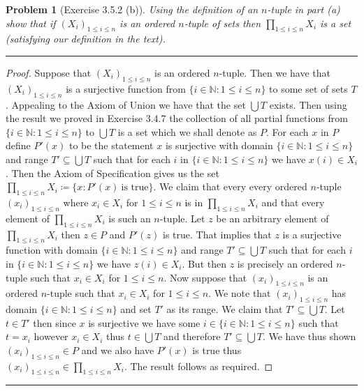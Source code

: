 \documentclass{article}
\newcommand{\lined}{\noindent\rule{\textwidth}{1pt}}
\newtheorem*{problem}{Problem}
\begin{document}
	\newpage
	
	\begin{problem}[Exercise 3.5.2 (b)]
		Using the definition of an $n$-tuple in part (a) show that if $(X_i)_{1 \leq i \leq n}$ is an ordered $n$-tuple of sets then 
		$\prod_{1 \leq i \leq n} X_i$ is a set (satisfying our definition in the text).
	\end{problem}
	
	\lined
	\begin{proof}
		Suppose that $(X_i)_{1 \leq i \leq n}$ is an ordered $n$-tuple. Then we have that $(X_i)_{1 \leq i \leq n}$ is a surjective function
		from $\{i \in \mathbb{N}:1\leq i \leq n\}$ to some set of sets $T$. Appealing to the Axiom of Union we have that the set 
		$\bigcup T$ exists. Then using the result we proved in Exercise 3.4.7 the collection of all partial functions from $\{i \in \mathbb{N}:1\leq i \leq n\}$ to $\bigcup T$ is a set which we shall denote as $P$. For each $x$ in $P$ define $P'(x)$ to be the statement $x$ is surjective with domain $\{i \in \mathbb{N}:1\leq i \leq n\}$ and range $T' \subseteq \bigcup T$ such that for each $i$ in $\{i \in \mathbb{N}:1\leq i \leq n\}$ we have $x(i) \in X_i$. Then the Axiom of Specification gives us the set 
		$\prod_{1 \leq i \leq n} X_i \coloneqq \{x:P'(x)\ \text{is true}\}$. We claim that every every ordered $n$-tuple $(x_i)_{1 \leq i \leq n}$
		where $x_i \in X_i$ for $1 \leq i \leq n$ is in $\prod_{1 \leq i \leq n} X_i$ and that every element of $\prod_{1 \leq i \leq n} X_i$ is such an $n$-tuple. Let $z$ be an arbitrary element of $\prod_{1 \leq i \leq n} X_i$ then $z \in P$ and $P'(z)$ is true. That implies that $z$ is a surjective function with domain $\{i \in \mathbb{N}:1\leq i \leq n\}$ and range $T' \subseteq \bigcup T$ such that for each $i$ in $\{i \in \mathbb{N}:1\leq i \leq n\}$ we have $z(i) \in X_i$. But then $z$ is precisely an ordered $n$-tuple such that 
		$x_i \in X_i$ for $1 \leq i \leq n$. Now suppose that $(x_i)_{1 \leq i \leq n}$ is an ordered $n$-tuple such that $x_i \in X_i$ for $1 \leq i \leq n$. We note that $(x_i)_{1 \leq i \leq n}$ has domain $\{i \in \mathbb{N}:1\leq i \leq n\}$ and set $T'$ as its range. We claim that $T' \subseteq \bigcup T$. Let $t \in T'$ then since $x$ is surjective we have some $i \in \{i \in \mathbb{N}:1\leq i \leq n\}$
		such that $t = x_i$ however $x_i \in X_i$ thus $t \in \bigcup T$ and therefore $T' \subseteq \bigcup T$. We have thus shown $(x_i)_{1 \leq i \leq n} \in P$ and we also have $P'(x)$ is true thus $(x_i)_{1 \leq i \leq n} \in \prod_{1 \leq i \leq n} X_i$. The result follows as required.
	\end{proof}
	\lined
\end{document}

